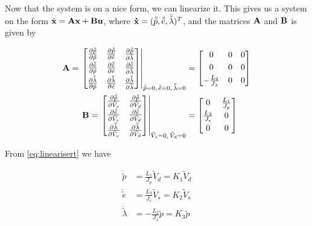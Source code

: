 Now that the system is on a nice form, we can linearize it. This gives us a system on the form $ \dot{\mathbf{x}} = \mathbf{A} \mathbf{x} + \mathbf{B} \mathbf{u} $, where $\mathbf{\dot x} = (\ddot{\tilde p}, \ddot{\tilde e}, \ddot{\tilde \lambda})^T$, and the matrices $\mathbf{A}$ and $\mathbf{B}$ is given by
	
\begin{subequations}
	\begin{align}
		\mathbf{A} =\left. \begin{bmatrix}
			\frac{\partial{\ddot{\tilde{p}}}}{\partial{\tilde p}} & \frac{\partial{\ddot{\tilde p}}}{\partial{\tilde e}} & \frac{\partial{\ddot{\tilde p}}}{\partial{\tilde \lambda}}\\[0.3em]
			\frac{\partial{\ddot{\tilde{e}}}}{\partial{\tilde p}} & \frac{\partial{\ddot{\tilde{e}}}}{\partial{\tilde e}} & \frac{\partial{\ddot{\tilde{e}}}}{\partial{\tilde \lambda}}\\[0.3em]
			\frac{\partial{\ddot{\tilde \lambda}}}{\partial{\tilde p}} & \frac{\partial{\ddot{\tilde \lambda}}}{\partial{\tilde e}} & \frac{\partial{\ddot{\tilde \lambda}}}{\partial{\tilde \lambda}}
		\end{bmatrix} \right|_{\ddot{\tilde p} = 0 ,\, \ddot{\tilde e} = 0,\, \ddot{\tilde \lambda} = 0 } &= 
		\begin{bmatrix}
			0 & 0 & 0\\[0.3em]
			0 & 0 & 0\\[0.3em]
			-\frac{L_2}{J_\lambda} & 0 & 0
		\end{bmatrix}\\
		\mathbf{B} = \left. \begin{bmatrix}
			\frac{\partial{\ddot{\tilde p}}}{\partial{\tilde V_s}} & \frac{\partial{\ddot{\tilde p}}}{\partial{\tilde V_d}}\\[0.3em]
			\frac{\partial{\ddot{\tilde e}}}{\partial{\tilde V_s}} & \frac{\partial{\ddot{\tilde e}}}{\partial{\tilde V_d}}\\[0.3em]
			\frac{\partial{\ddot{\tilde \lambda}}}{\partial{\tilde V_s}} & \frac{\partial{\ddot{\tilde \lambda}}}{\partial{\tilde V_d}}
		\end{bmatrix} \right|_{\tilde V_s = 0,\, \tilde V_d = 0} &= 
		\begin{bmatrix}
			0 & \frac{L_1}{J_p}\\[0.3em]
			\frac{L_3}{J_e} & 0\\[0.3em]
			0 & 0
		\end{bmatrix}
	\end{align}
	\label{eq:linearisert}
\end{subequations}

From \cref{eq:linearisert} we have

\begin{subequations}
	\begin{align}
		\ddot{\tilde p} &= \frac{L_1}{J_p} \tilde V_d = K_1 \tilde V_d\\
		\ddot{\tilde e} &= \frac{L_3}{J_e} \tilde V_s = K_2 \tilde V_s\\
		\ddot{\tilde \lambda} &= -\frac{L_2}{J_{\lambda}} \tilde p = K_3 \tilde p \label{eq:linddotlambda}
	\end{align}
\end{subequations}

